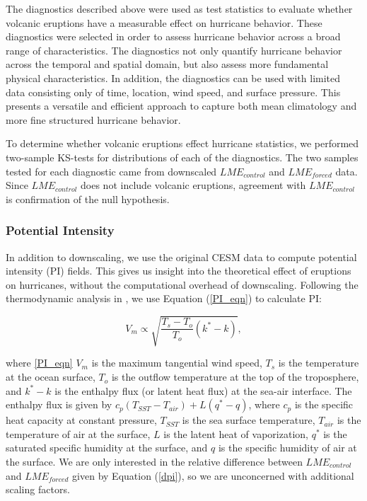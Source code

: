 \documentclass[phd,tocprelim]{cornell}
\begin{document}
The diagnostics described above were used as test statistics to
evaluate whether volcanic eruptions have a measurable effect on
hurricane behavior. These diagnostics were selected in order to assess
hurricane behavior across a broad range of characteristics. The
diagnostics not only quantify hurricane behavior across the temporal
and spatial domain, but also assess more fundamental physical
characteristics. In addition, the diagnostics can be used with limited
data consisting only of time, location, wind speed, and surface
pressure. This presents a versatile and efficient approach to capture
both mean climatology and more fine structured hurricane behavior.

To determine whether volcanic eruptions effect hurricane statistics,
we performed two-sample KS-tests for distributions of each of the
diagnostics. The two samples tested for each diagnostic came from
downscaled $LME_{control}$ and $LME_{forced}$ data. Since
$LME_{control}$ does not include volcanic eruptions, agreement with
$LME_{control}$ is confirmation of the null hypothesis.

\subsubsection{Potential Intensity}
In addition to downscaling, we use the original CESM data to compute
potential intensity (PI) fields. This gives us insight into the
theoretical effect of eruptions on hurricanes, without the
computational overhead of downscaling. Following the thermodynamic
analysis in \cite{pi_ke}, we use Equation (\ref{PI_eqn}) to calculate
PI:

\begin{equation}
{V_m} \propto \sqrt{\frac{T_s-T_{o}}{T_{o}}(k^{*}-k)},
\label{PI_eqn}
\end{equation}

where \ref{PI_eqn} $V_m$ is the maximum tangential wind speed, $T_s$
is the temperature at the ocean surface, $T_o$ is the outflow
temperature at the top of the troposphere, and $k^{*}-k$ is the
enthalpy flux (or latent heat flux) at the sea-air interface. The
enthalpy flux is given by $c_p(T_{SST}-T_{air})+L(q^{*}-q)$, where
$c_p$ is the specific heat capacity at constant pressure, $T_{SST}$ is
the sea surface temperature, $T_{air}$ is the temperature of air at
the surface, $L$ is the latent heat of vaporization, $q^{*}$ is the
saturated specific humidity at the surface, and $q$ is the specific
humidity of air at the surface. We are only interested in the relative
difference between $LME_{control}$ and $LME_{forced}$ given by
Equation (\ref{dpi}), so we are unconcerned with additional scaling
factors.
\end{document}
